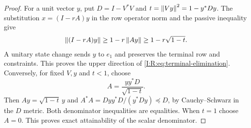 \begin{proof}
For a unit vector $y$, put $D=I-V^*V$ and
$t=\left\lVert Vy\right\rVert^2=1-y^*Dy$.  The substitution $x=(I-rA)y$ in the row
operator norm and the passive inequality give
\[
 \left\lVert(I-rA)y\right\rVert\ge1-r\left\lVert Ay\right\rVert\ge1-r\sqrt{1-t}.
\]
A unitary state change sends $y$ to $e_1$ and preserves the terminal
row and constraints.  This proves the upper direction of
\eqref{I:R:eq:terminal-elimination}.  Conversely, for fixed $V,y$ and
$t<1$, choose
\[
 A=\frac{yy^*D}{\sqrt{1-t}}.
\]
Then $Ay=\sqrt{1-t}\,y$ and
$A^*A=Dyy^*D/(y^*Dy)\preceq D$, by Cauchy--Schwarz in the $D$
metric.  Both denominator inequalities are equalities.  When $t=1$
choose $A=0$.  This proves exact attainability of the scalar
denominator.
\end{proof}
